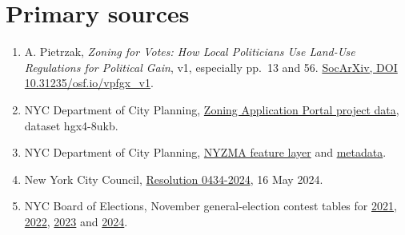 \documentclass[11pt]{article}
\begin{document}
\section*{Primary sources}
\begin{enumerate}
\item A. Pietrzak, \emph{Zoning for Votes: How Local Politicians Use Land-Use Regulations for Political Gain}, v1, especially pp.\ 13 and 56. \href{https://doi.org/10.31235/osf.io/vpfgx_v1}{SocArXiv, DOI 10.31235/osf.io/vpfgx\_v1}.
\item NYC Department of City Planning, \href{https://catalog.data.gov/dataset/zoning-application-portal-zap-project-data}{Zoning Application Portal project data}, dataset hgx4-8ukb.
\item NYC Department of City Planning, \href{https://services5.arcgis.com/GfwWNkhOj9bNBqoJ/ArcGIS/rest/services/nyzma/FeatureServer/0}{NYZMA feature layer} and \href{https://www.nyc.gov/assets/planning/download/pdf/data-maps/open-data/nyzma_metdata.pdf}{metadata}.
\item New York City Council, \href{https://legistar.council.nyc.gov/LegislationDetail.aspx?GUID=78F34ECD-DC13-43FB-8667-19DC1644BD2F&ID=6660828}{Resolution 0434-2024}, 16 May 2024.
\item NYC Board of Elections, November general-election contest tables for \href{https://vote.nyc/page/election-results-summary-2021}{2021}, \href{https://vote.nyc/page/election-results-summary-2022}{2022}, \href{https://vote.nyc/page/election-results-summary-2023}{2023} and \href{https://vote.nyc/page/election-results-summary-2024}{2024}.
\end{enumerate}
\end{document}
